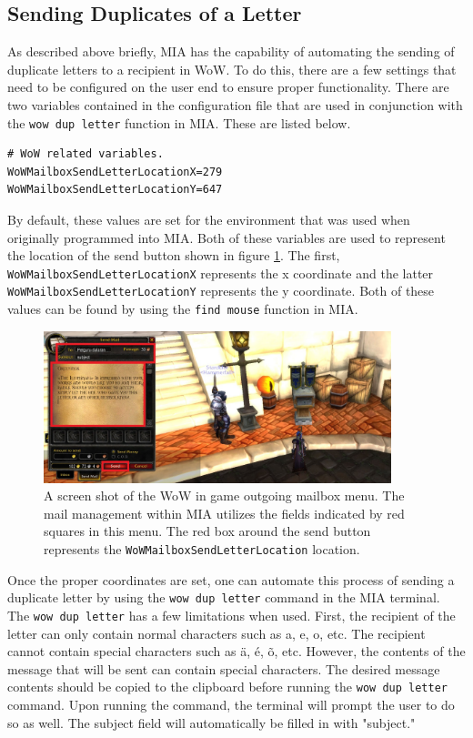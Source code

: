 \subsection{Sending Duplicates of a Letter}

As described above briefly, MIA has the capability of automating the sending of duplicate letters to a recipient in WoW. To do this, there are a few settings that need to be configured on the user end to ensure proper functionality. There are two variables contained in the configuration file that are used in conjunction with the \texttt{wow dup letter} function in MIA. These are listed below.

\begin{lstlisting}[style=pythonstyle]
# WoW related variables.
WoWMailboxSendLetterLocationX=279
WoWMailboxSendLetterLocationY=647
\end{lstlisting}

By default, these values are set for the environment that was used when originally programmed into MIA. Both of these variables are used to represent the location of the send button shown in figure \ref{wow mailbox send}. The first, \texttt{WoWMailboxSendLetterLocationX} represents the x coordinate and the latter \texttt{WoWMailboxSendLetterLocationY} represents the y coordinate. Both of these values can be found by using the \texttt{find mouse} function in MIA. 

\begin{figure}[h]
	\centering
	\includegraphics[width=0.9\textwidth]{images/WoWScrnShot_040518_181350b.jpg}
	\caption{A screen shot of the WoW in game outgoing mailbox menu. The mail management within MIA utilizes the fields indicated by red squares in this menu. The red box around the send button represents the \texttt{WoWMailboxSendLetterLocation} location.} \label{wow mailbox send}
\end{figure}

Once the proper coordinates are set, one can automate this process of sending a duplicate letter by using the \texttt{wow dup letter} command in the MIA terminal. The \texttt{wow dup letter} has a few limitations when used. First, the recipient of the letter can only contain normal characters such as a, e, o, etc. The recipient cannot contain special characters such as \"{a}, \'{e}, \~{o}, etc. However, the contents of the message that will be sent can contain special characters. The desired message contents should be copied to the clipboard before running the \texttt{wow dup letter} command. Upon running the command, the terminal will prompt the user to do so as well. The subject field will automatically be filled in with "subject."

